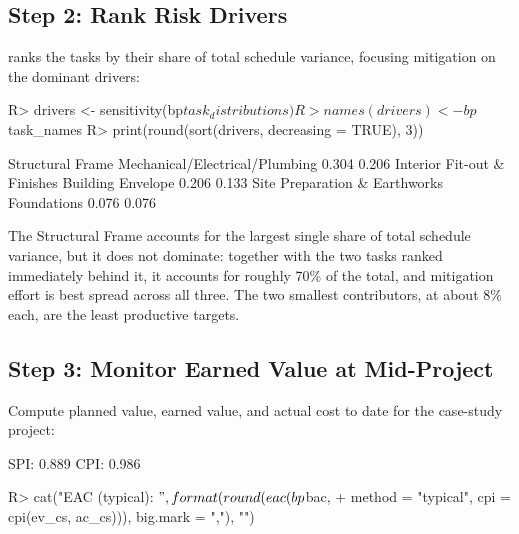 \documentclass[
]{jss}
\begin{document}
\subsection{Step 2: Rank Risk Drivers}\label{step-2-rank-risk-drivers}

 ranks the tasks by their share of total schedule
variance, focusing mitigation on the dominant drivers:

\begin{CodeChunk}
\begin{CodeInput}
R> drivers <- sensitivity(bp$task_distributions)
R> names(drivers) <- bp$task_names
R> print(round(sort(drivers, decreasing = TRUE), 3))
\end{CodeInput}
\begin{CodeOutput}
              Structural Frame Mechanical/Electrical/Plumbing 
                         0.304                          0.206 
   Interior Fit-out & Finishes              Building Envelope 
                         0.206                          0.133 
 Site Preparation & Earthworks                    Foundations 
                         0.076                          0.076 
\end{CodeOutput}
\end{CodeChunk}

The Structural Frame accounts for the largest single share of total
schedule variance, but it does not dominate: together with the two tasks
ranked immediately behind it, it accounts for roughly 70\% of the total,
and mitigation effort is best spread across all three. The two smallest
contributors, at about 8\% each, are the least productive targets.

\subsection{Step 3: Monitor Earned Value at
Mid-Project}\label{step-3-monitor-earned-value-at-mid-project}

Compute planned value, earned value, and actual cost to date for the
case-study project:

\begin{CodeChunk}
\begin{CodeOutput}
SPI: 0.889  CPI: 0.986 
\end{CodeOutput}
\begin{CodeInput}
R> cat("EAC (typical): $", format(round(eac(bp$bac,
+     method = "typical", cpi = cpi(ev_cs, ac_cs))), big.mark = ","), "\n")
\end{CodeInput}
\end{CodeChunk}
\end{document}
